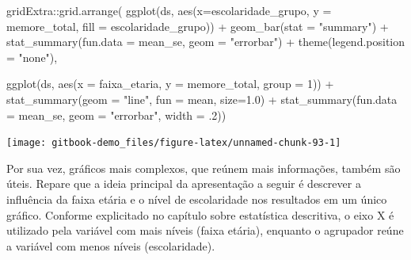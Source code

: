 \documentclass[
]{book}
\newenvironment{Shaded}{\begin{snugshade}}{\end{snugshade}}
\newcommand{\AttributeTok}[1]{\textcolor[rgb]{0.77,0.63,0.00}{#1}}
\newcommand{\DecValTok}[1]{\textcolor[rgb]{0.00,0.00,0.81}{#1}}
\newcommand{\FloatTok}[1]{\textcolor[rgb]{0.00,0.00,0.81}{#1}}
\newcommand{\FunctionTok}[1]{\textcolor[rgb]{0.00,0.00,0.00}{#1}}
\newcommand{\NormalTok}[1]{#1}
\newcommand{\SpecialCharTok}[1]{\textcolor[rgb]{0.00,0.00,0.00}{#1}}
\newcommand{\StringTok}[1]{\textcolor[rgb]{0.31,0.60,0.02}{#1}}
\begin{document}
\begin{Shaded}
\begin{Highlighting}[]
\NormalTok{gridExtra}\SpecialCharTok{::}\FunctionTok{grid.arrange}\NormalTok{(}
  \FunctionTok{ggplot}\NormalTok{(ds, }\FunctionTok{aes}\NormalTok{(}\AttributeTok{x=}\NormalTok{escolaridade\_grupo, }\AttributeTok{y =}\NormalTok{ memore\_total, }
                 \AttributeTok{fill =}\NormalTok{ escolaridade\_grupo)) }\SpecialCharTok{+}
    \FunctionTok{geom\_bar}\NormalTok{(}\AttributeTok{stat =} \StringTok{"summary"}\NormalTok{) }\SpecialCharTok{+}
    \FunctionTok{stat\_summary}\NormalTok{(}\AttributeTok{fun.data =}\NormalTok{ mean\_se, }\AttributeTok{geom =} \StringTok{"errorbar"}\NormalTok{) }\SpecialCharTok{+}
    \FunctionTok{theme}\NormalTok{(}\AttributeTok{legend.position =} \StringTok{"none"}\NormalTok{),}
  
  \FunctionTok{ggplot}\NormalTok{(ds, }\FunctionTok{aes}\NormalTok{(}\AttributeTok{x =}\NormalTok{ faixa\_etaria, }\AttributeTok{y =}\NormalTok{ memore\_total, }\AttributeTok{group =} \DecValTok{1}\NormalTok{)) }\SpecialCharTok{+}
  \FunctionTok{stat\_summary}\NormalTok{(}\AttributeTok{geom =} \StringTok{"line"}\NormalTok{, }\AttributeTok{fun =}\NormalTok{ mean, }\AttributeTok{size=}\FloatTok{1.0}\NormalTok{) }\SpecialCharTok{+}
  \FunctionTok{stat\_summary}\NormalTok{(}\AttributeTok{fun.data =}\NormalTok{ mean\_se, }\AttributeTok{geom =} \StringTok{"errorbar"}\NormalTok{, }\AttributeTok{width =}\NormalTok{ .}\DecValTok{2}\NormalTok{))}
\end{Highlighting}
\end{Shaded}

\begin{center}\texttt{[image: gitbook-demo\_files/figure-latex/unnamed-chunk-93-1]} \end{center}

Por sua vez, gráficos mais complexos, que reúnem mais informações, também são úteis. Repare que a ideia principal da apresentação a seguir é descrever a influência da faixa etária e o nível de escolaridade nos resultados em um único gráfico. Conforme explicitado no capítulo sobre estatística descritiva, o eixo X é utilizado pela variável com mais níveis (faixa etária), enquanto o agrupador reúne a variável com menos níveis (escolaridade).
\end{document}
